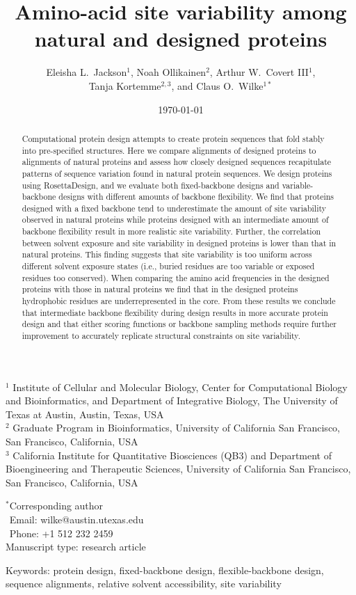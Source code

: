 \documentclass[12pt]{article}
\title{Amino-acid site variability among natural and designed proteins}
\author{Eleisha L.\ Jackson$^1$, Noah Ollikainen$^2$, Arthur W.\ Covert III$^1$,\\ Tanja Kortemme$^{2,3}$, and Claus O.\ Wilke$^{1*}$}
\begin{document}
\date{\today}
\maketitle

\noindent
$^1$ Institute of Cellular and Molecular Biology, Center for Computational Biology and Bioinformatics, and Department of Integrative Biology, The University of Texas at Austin, Austin, Texas, USA\\
$^2$ Graduate Program in Bioinformatics, University of California San Francisco, San Francisco, California, USA\\
$^3$ California Institute for Quantitative Biosciences (QB3) and Department of Bioengineering and Therapeutic Sciences, University of California San Francisco, San Francisco, California, USA

\bigskip
\noindent
$^*$Corresponding author\\
$\phantom{^*}$Email: wilke@austin.utexas.edu\\
$\phantom{^*}$Phone: +1 512 232 2459\\

\bigskip
\noindent
Manuscript type: research article

\bigskip
\noindent Keywords: protein design, fixed-backbone design, flexible-backbone design, sequence alignments, relative solvent accessibility, site variability

\newpage
\begin{abstract}
Computational protein design attempts to create protein sequences that fold stably into pre-specified structures. Here we compare alignments of designed proteins to alignments of natural proteins and assess how closely designed sequences recapitulate patterns of sequence variation found in natural protein sequences. We design proteins using RosettaDesign, and we evaluate both fixed-backbone designs and variable-backbone designs with different amounts of backbone flexibility. We find that proteins designed with a fixed backbone tend to underestimate the amount of site variability observed in natural proteins while proteins designed with an intermediate amount of backbone flexibility result in more realistic site variability. Further, the correlation between solvent exposure and site variability in designed proteins is lower than that in natural proteins. This finding suggests that site variability is too uniform across different solvent exposure states (i.e., buried residues are too variable or exposed residues too conserved). When comparing the amino acid frequencies in the designed proteins with those in natural proteins we find that in the designed proteins hydrophobic residues are underrepresented in the core. From these results we conclude that intermediate backbone flexibility during design results in more accurate protein design and that either scoring functions or backbone sampling methods require further improvement to accurately replicate structural constraints on site variability.
\end{abstract}
\end{document}
